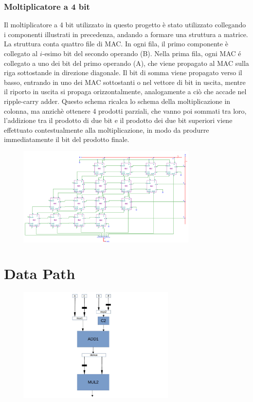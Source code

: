 \documentclass[10pt]{article}
\begin{document}
\begin{itemize}
\subsubsection{Moltiplicatore a 4 bit}
Il moltiplicatore a 4 bit utilizzato in questo progetto è stato utilizzato collegando i componenti illustrati in precedenza, andando a formare una struttura a matrice.
La struttura conta quattro file di MAC. In ogni fila, il primo componente è collegato al $i$-esimo bit del secondo operando (B).
Nella prima fila, ogni MAC é collegato a uno dei bit del primo operando (A), che viene propagato al MAC sulla riga sottostande in direzione diagonale.
Il bit di somma viene propagato verso il basso, entrando in uno dei MAC sottostanti o nel vettore di bit in uscita, mentre il riporto in uscita si propaga orizzontalmente, analogamente a ciò che accade
nel ripple-carry adder.
Questo schema ricalca lo schema della moltiplicazione in colonna, ma anzichè ottenere 4 prodotti parziali, che vanno poi sommati tra loro, l'addizione tra il prodotto di due bit e il prodotto dei due
bit superiori viene effettuato contestualmente alla moltiplicazione, in modo da produrre immediatamente il bit del prodotto finale.

\begin{figure}[H]
    \includegraphics[width=0.8\textwidth]{MUL}
    \centering
\end{figure}


\section{Data Path}
\begin{figure}[H]
    \includegraphics[width=0.7\textwidth]{datapath}
    \centering
\end{figure}



\end{itemize}
\end{document}
